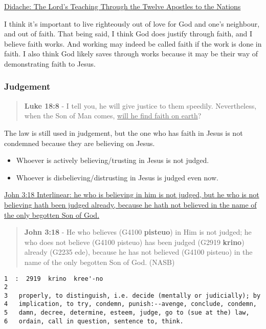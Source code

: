 \documentclass[11pt]{article}
\begin{document}
\href{https://www.earlychristianwritings.com/text/didache-roberts.html}{Didache: The Lord's Teaching Through the Twelve Apostles to the Nations}

I think it's important to live righteously out of love for God and one's neighbour, and out of faith.
That being said, I think God does justify through faith, and I believe faith works. And working may indeed be called faith if the work is done in faith.
I also think God likely saves through works because it may be their way of demonstrating faith to Jesus.

\subsubsection{Judgement}
\label{sec:org8575762}
\begin{quote}
\textbf{Luke 18:8} - I tell you, he will give justice to them speedily. Nevertheless, when the Son of Man comes, \uline{will he find faith on earth}?
\end{quote}

The law is still used in judgement, but the one who has faith in Jesus is not condemned because they are believing on Jesus.

\begin{itemize}
\item Whoever is actively believing/trusting in Jesus is not judged.
\item Whoever is disbelieving/distrusting in Jesus is judged even now.
\end{itemize}

\href{https://biblehub.com/interlinear/john/3-18.htm}{John 3:18 Interlinear: he who is believing in him is not judged, but he who is not believing hath been judged already, because he hath not believed in the name of the only begotten Son of God.}

\begin{quote}
\textbf{John 3:18} - He who believes (G4100 \textbf{pisteuo}) in Him is not judged; he who does not believe (G4100 pisteuo) has been judged (G2919 \textbf{krino}) already (G2235 ede), because he has not believed (G4100 pisteuo) in the name of the only begotten Son of God. (NASB)
\end{quote}

\begin{verbatim}
1  :  2919  krino  kree'-no
2  
3   properly, to distinguish, i.e. decide (mentally or judicially); by
4   implication, to try, condemn, punish:--avenge, conclude, condemn,
5   damn, decree, determine, esteem, judge, go to (sue at the) law,
6   ordain, call in question, sentence to, think.
\end{verbatim}
\end{document}
